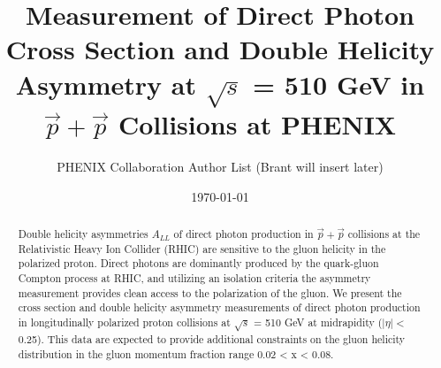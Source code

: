 \documentclass[twocolumn,letterpaper,aps,prl,longbibliography,superscriptaddress,floatfix]{revtex4-2}
\begin{document}


\title{Measurement of Direct Photon Cross Section and Double Helicity Asymmetry at $\sqrt{s}$ = 510 GeV in $\vec{p}+\vec{p}$ Collisions at PHENIX}

\author{PHENIX Collaboration Author List (Brant will insert later)}

\date{\today}

\begin{abstract}
Double helicity asymmetries $A_{LL}$ of direct photon production in $\vec{p}+\vec{p}$ collisions at the Relativistic Heavy Ion Collider (RHIC) are sensitive to the gluon helicity in the polarized proton. Direct photons are dominantly produced by the quark-gluon Compton process at RHIC, and utilizing an isolation criteria the asymmetry measurement provides clean access to the polarization of the gluon. We present the cross section and double helicity asymmetry measurements of direct photon production in longitudinally polarized proton collisions at $\sqrt{s}$ = 510 GeV at midrapidity ($|\eta| <$ 0.25). This data are expected to provide additional constraints on the gluon helicity distribution in the gluon momentum fraction range 0.02 < x < 0.08.
\end{abstract}

	
\maketitle

\end{document}
